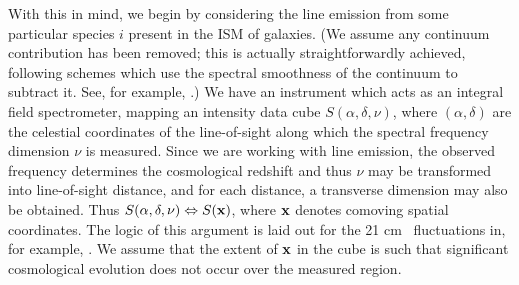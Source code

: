 With this in mind, we begin by considering the line emission from some
particular species $i$ present in the ISM of galaxies.  (We assume any
continuum contribution has been removed; this is actually
straightforwardly achieved, following schemes which use the spectral
smoothness of the continuum to subtract it.  See, for example,
\citet{bowman09}.)  We have an instrument which acts as an integral
field spectrometer, mapping an intensity data cube
$S(\alpha,\delta,\nu)$, where $(\alpha,\delta)$ are the celestial
coordinates of the line-of-sight along which the spectral frequency
dimension $\nu$ is measured.  Since we are working with line emission,
the observed frequency determines the cosmological redshift and thus
$\nu$ may be transformed into line-of-sight distance, and for each
distance, a transverse dimension may also be obtained.  Thus
$S(\alpha,\delta,\nu) \Leftrightarrow S(\mathbf{x})$, where $\mathbf{x}$
denotes comoving spatial coordinates.  The logic of this argument is
laid out for the 21 cm \hi\ fluctuations in, for example,
\citet{morales05}.  We assume that the extent of $\mathbf{x}$ in the
cube is such that significant cosmological evolution does not occur
over the measured region.

